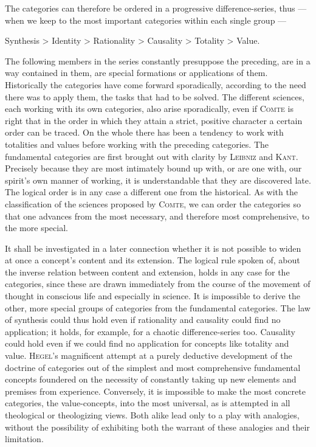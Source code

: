 \documentclass[12pt]{book}
\begin{document}
The categories can therefore be ordered in a progressive difference-series,
thus --- when we keep to the most important categories within each single
group ---

\begin{center}
Synthesis > Identity > Rationality > Causality > Totality > Value.
\end{center}

The following members in the series constantly presuppose the preceding, are in
a way contained in them, are special formations or applications of them.
Historically the categories have come forward sporadically, according to the
need there was to apply them, the tasks that had to be solved. The different
sciences, each working with its own categories, also arise sporadically, even if
\textsc{Comte} is right that in the order in which they attain a strict,
positive character a certain order can be traced. On the whole there has been a
tendency to work with totalities and values before working with the preceding
categories. The fundamental categories are first brought out with clarity by
\textsc{Leibniz} and \textsc{Kant}. Precisely because they are most intimately
bound up with, or are one with, our spirit's own manner of working, it is
understandable that they are discovered late. The logical order is in any case a
different one from the historical. As with the classification of the sciences
proposed by \textsc{Comte}, we can order the categories so that one advances
from the most necessary, and therefore most comprehensive, to the more special.

It shall be investigated in a later connection whether it is not possible to
widen at once a concept's content and its extension. The logical rule spoken of,
about the inverse relation between content and extension, holds in any case for
the categories, since these are drawn immediately from the course of the
movement of thought in conscious life and especially in science. It is
impossible to derive the other, more special groups of categories from the
fundamental categories. The law of synthesis could thus hold even if rationality
and causality could find no application; it holds, for example, for a chaotic
difference-series too. Causality could hold even if we could find no application
for concepts like totality and value. \textsc{Hegel}'s magnificent attempt at a
purely deductive development of the doctrine of categories out of the simplest
and most comprehensive fundamental concepts foundered on the necessity of
constantly taking up new elements and premises from experience. Conversely, it
is impossible to make the most concrete categories, the value-concepts, into the
most universal, as is attempted in all theological or theologizing views. Both
alike lead only to a play with analogies, without the possibility of exhibiting
both the warrant of these analogies and their limitation.
\end{document}
